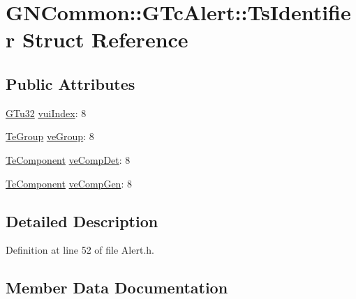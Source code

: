 \hypertarget{struct_g_n_common_1_1_g_tc_alert_1_1_ts_identifier}{}\section{G\+N\+Common\+:\+:G\+Tc\+Alert\+:\+:Ts\+Identifier Struct Reference}
\label{struct_g_n_common_1_1_g_tc_alert_1_1_ts_identifier}
\subsection*{Public Attributes}
\begin{DoxyCompactItemize}
\item 
\mbox{\hyperlink{namespace_g_n_common_ae5485474bc8f23e462e920a17b377b53}{G\+Tu32}} \mbox{\hyperlink{struct_g_n_common_1_1_g_tc_alert_1_1_ts_identifier_a83bb4d784e9f8d772b79a2faab4c279c}{vui\+Index}}\+: 8
\item 
\mbox{\hyperlink{class_g_n_common_1_1_g_tc_alert_a2deb7f82fcf5d88b4e10d74fa6c28cb7}{Te\+Group}} \mbox{\hyperlink{struct_g_n_common_1_1_g_tc_alert_1_1_ts_identifier_af23bb4b61df8abb45a4a77162a91e980}{ve\+Group}}\+: 8
\item 
\mbox{\hyperlink{class_g_n_common_1_1_g_tc_alert_aec0a7908321c01ae225df4908d7f3fa0}{Te\+Component}} \mbox{\hyperlink{struct_g_n_common_1_1_g_tc_alert_1_1_ts_identifier_ac500c0db17c543fec720ef745966a53b}{ve\+Comp\+Det}}\+: 8
\item 
\mbox{\hyperlink{class_g_n_common_1_1_g_tc_alert_aec0a7908321c01ae225df4908d7f3fa0}{Te\+Component}} \mbox{\hyperlink{struct_g_n_common_1_1_g_tc_alert_1_1_ts_identifier_a410931b980bb13ee9eeece7f69c576b1}{ve\+Comp\+Gen}}\+: 8
\end{DoxyCompactItemize}


\subsection{Detailed Description}


Definition at line 52 of file Alert.\+h.



\subsection{Member Data Documentation}
\mbox{\label{struct_g_n_common_1_1_g_tc_alert_1_1_ts_identifier_ac500c0db17c543fec720ef745966a53b}} 
